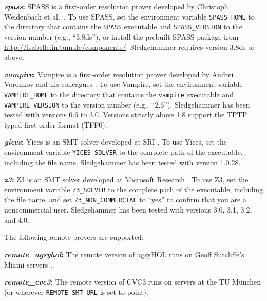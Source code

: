 \documentclass[a4paper,12pt]{article}
\newcommand\download{\url{http://isabelle.in.tum.de/components/}}
\begin{document}
\begin{enum}
\begin{sloppy}
\begin{enum}
\item[\labelitemi] \textbf{\textit{spass}:} SPASS is a first-order resolution
prover developed by Christoph Weidenbach et al.\ \cite{weidenbach-et-al-2009}.
To use SPASS, set the environment variable \texttt{SPASS\_HOME} to the directory
that contains the \texttt{SPASS} executable and \texttt{SPASS\_VERSION} to the
version number (e.g., ``3.8ds''), or install the prebuilt SPASS package from
\download. Sledgehammer requires version 3.8ds or above.

\item[\labelitemi] \textbf{\textit{vampire}:} Vampire is a first-order
resolution prover developed by Andrei Voronkov and his colleagues
\cite{riazanov-voronkov-2002}. To use Vampire, set the environment variable
\texttt{VAMPIRE\_HOME} to the directory that contains the \texttt{vampire}
executable and \texttt{VAMPIRE\_VERSION} to the version number (e.g.,
``2.6''). Sledgehammer has been tested with versions 0.6 to 3.0.
Versions strictly above 1.8 support the TPTP typed first-order format (TFF0).

\item[\labelitemi] \textbf{\textit{yices}:} Yices is an SMT solver developed at
SRI \cite{yices}. To use Yices, set the environment variable
\texttt{YICES\_SOLVER} to the complete path of the executable, including the
file name. Sledgehammer has been tested with version 1.0.28.

\item[\labelitemi] \textbf{\textit{z3}:} Z3 is an SMT solver developed at
Microsoft Research \cite{z3}. To use Z3, set the environment variable
\texttt{Z3\_SOLVER} to the complete path of the executable, including the file
name, and set \texttt{Z3\_NON\_COMMERCIAL} to ``yes'' to confirm that you are a
noncommercial user. Sledgehammer has been tested with versions 3.0, 3.1, 3.2,
and 4.0.
\end{enum}
\end{sloppy}

The following remote provers are supported:

\begin{enum}
\item[\labelitemi] \textbf{\textit{remote\_agsyhol}:} The remote version of
agsyHOL runs on Geoff Sutcliffe's Miami servers \cite{sutcliffe-2000}.

\item[\labelitemi] \textbf{\textit{remote\_cvc3}:} The remote version of CVC3 runs
on servers at the TU M\"unchen (or wherever \texttt{REMOTE\_SMT\_URL} is set to
point).


\end{enum}
\end{enum}
\end{document}
